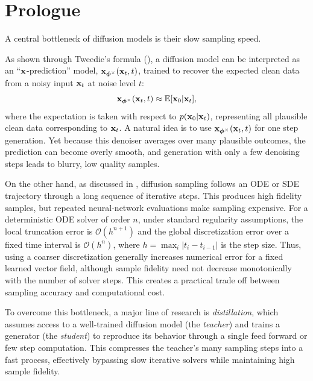 \clearpage
\newpage


\section{Prologue}\label{sec:distillation-prologue}
A central bottleneck of diffusion models is their slow sampling speed.  

As shown through Tweedie's formula (), a diffusion model can be interpreted as an ``${\mathbf{x}}$-prediction'' model, ${\mathbf{x}}_{\bm{\phi}^\times}({\mathbf{x}}_t, t)$, trained to recover the expected clean data from a noisy input ${\mathbf{x}}_t$ at noise level $t$:
\[
    {\mathbf{x}}_{\bm{\phi}^\times}({\mathbf{x}}_t, t) \approx \mathbb{E}[{\mathbf{x}}_0 |{\mathbf{x}}_t],
\]
where the expectation is taken with respect to $p({\mathbf{x}}_0 |{\mathbf{x}}_t)$, representing all plausible clean data corresponding to ${\mathbf{x}}_t$.  
A natural idea is to use ${\mathbf{x}}_{\bm{\phi}^\times}({\mathbf{x}}_t, t)$ for one step generation. Yet because this denoiser averages over many plausible outcomes, the prediction can become overly smooth, and generation with only a few denoising steps leads to blurry, low quality samples.  

On the other hand, as discussed in , diffusion sampling follows an ODE or SDE trajectory through a long sequence of iterative steps. This produces high fidelity samples, but repeated neural-network evaluations make sampling expensive. For a deterministic ODE solver of order $n$, under standard regularity assumptions, the local truncation error is $\mathcal{O}(h^{n+1})$ and the global discretization error over a fixed time interval is $\mathcal{O}(h^n)$, where $h=\max_i |t_i-t_{i-1}|$ is the step size. Thus, using a coarser discretization generally increases numerical error for a fixed learned vector field, although sample fidelity need not decrease monotonically with the number of solver steps. This creates a practical trade off between sampling accuracy and computational cost. 

To overcome this bottleneck, a major line of research is \emph{distillation}, which assumes access to a well-trained diffusion model (the \emph{teacher}) and trains a generator (the \emph{student}) to reproduce its behavior through a single feed forward or few step computation. 
This compresses the teacher’s many sampling steps into a fast process, effectively bypassing slow iterative solvers while maintaining high sample fidelity.




